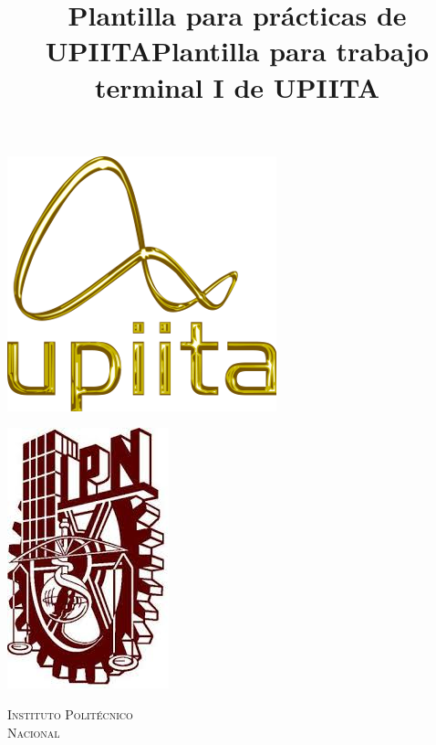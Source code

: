 \documentclass[12pt]{article}
\title{Plantilla para prácticas de UPIITA}
\title{Plantilla para trabajo terminal I de UPIITA}
\begin{document}
 
\begin{center}																		%
\newcommand{\HRule}{\rule{\linewidth}{0.5mm}}									%
\begin{minipage}{0.48\textwidth} \begin{flushleft}
\includegraphics[scale = 0.4]{Imagenes/logo_upiita}
\end{flushleft}\end{minipage}
\begin{minipage}{0.48\textwidth} \begin{flushright}
\includegraphics[scale = 0.25]{Imagenes/IPN}
\end{flushright}\end{minipage}

\vspace*{-1.5cm}								%
\textsc{\huge Instituto Polit\'ecnico\\ \vspace{5px} Nacional}\\[1.5cm]	


\end{center}
\end{document}
